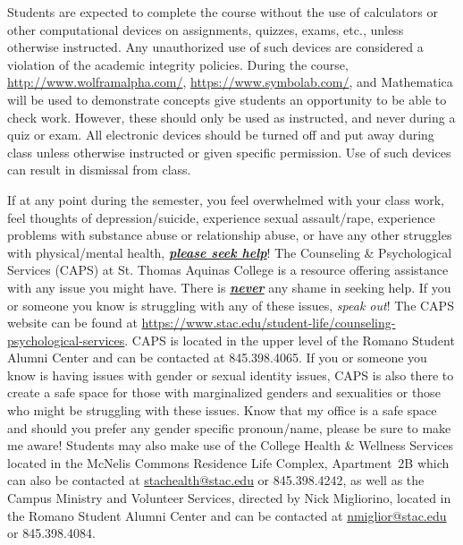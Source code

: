 \documentclass[11pt,letterpaper]{article}
\begin{document}
Students are expected to complete the course without the use of calculators or other computational devices on assignments, quizzes, exams, etc., unless otherwise instructed. Any unauthorized use of such devices are considered a violation of the academic integrity policies. During the course, \href{http://www.wolframalpha.com/}{http://www.wolframalpha.com/}, \href{https://www.symbolab.com/}{https://www.symbolab.com/}, and Mathematica will be used to demonstrate concepts give students an opportunity to be able to check work. However, these should only be used as instructed, and never during a quiz or exam. All electronic devices should be turned off and put away during class unless otherwise instructed or given specific permission. Use of such devices can result in dismissal from class.
\sectionbreak



If at any point during the semester, you feel overwhelmed with your class work, feel thoughts of depression/suicide, experience sexual assault/rape, experience problems with substance abuse or relationship abuse, or have any other struggles with physical/mental health, \underline{\bfseries\itshape please seek help}! The Counseling \& Psychological Services (CAPS) at St. Thomas Aquinas College is a resource offering assistance with any issue you might have. There is \underline{\bfseries\itshape never} any shame in seeking help. If you or someone you know is struggling with any of these issues, {\itshape speak out}! The CAPS website can be found at \href{https://www.stac.edu/student-life/counseling-psychological-services}{https://www.stac.edu/student-life/counseling-psychological-services}. CAPS is located in the upper level of the Romano Student Alumni Center and can be contacted at 845.398.4065. If you or someone you know is having issues with gender or sexual identity issues, CAPS is also there to create a safe space for those with marginalized genders and sexualities or those who might be struggling with these issues. Know that my office is a safe space and should you prefer any gender specific pronoun/name, please be sure to make me aware! Students may also make use of the College Health \& Wellness Services located in the McNelis Commons Residence Life Complex, Apartment~2B which can also be contacted at \href{mailto:stachealth@stac.edu}{stachealth@stac.edu} or 845.398.4242, as well as the Campus Ministry and Volunteer Services, directed by Nick Migliorino, located in the Romano Student Alumni Center and can be contacted at \href{mailto:nmiglior@stac.edu}{nmiglior@stac.edu} or 845.398.4084.
\sectionbreak
\end{document}
